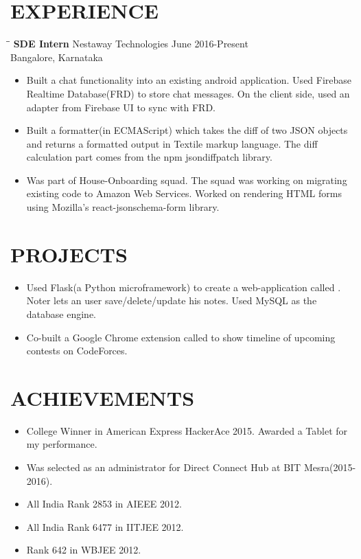 \documentclass{res}
\begin{document}
\begin{resume}
 
\section{EXPERIENCE}
   \vspace{-0.1in}	
   \begin{tabbing}
   \hspace{2.1in}\= \hspace{2.3in}\= \kill %
    {\bf SDE Intern} \>Nestaway  Technologies   \>June 2016-Present\\
                             \>Bangalore, Karnataka
   \end{tabbing}      %
   \begin{itemize}
    \item Built a chat functionality into an existing android application. Used Firebase Realtime Database(FRD) to store chat messages. On the client side, used an adapter from Firebase UI to sync with FRD.
    \item Built a formatter(in ECMAScript) which takes the diff of two JSON objects and returns a formatted output in Textile markup language. The diff calculation part comes from the npm jsondiffpatch library.
    \item Was part of House-Onboarding squad. The squad was working on migrating existing code to Amazon Web Services. Worked on rendering HTML forms using Mozilla's react-jsonschema-form library.
    \end{itemize}

\section{PROJECTS}          
    \begin{itemize}
    \item Used Flask(a Python microframework) to create a web-application called . Noter lets an user save/delete/update his notes. Used MySQL as the database engine. 
    \item Co-built a Google Chrome extension called  to show timeline of upcoming contests on CodeForces.  
    \end{itemize}
 
 
\section{ACHIEVEMENTS}          
   \begin{itemize}
   \item College Winner in American Express HackerAce 2015. Awarded a Tablet for my performance.
    \item Was selected as an administrator for Direct Connect Hub at BIT Mesra(2015-2016).
    \item All India Rank 2853 in AIEEE 2012.
    \item All India Rank 6477 in IITJEE 2012.
    \item Rank 642 in WBJEE 2012.
    \end{itemize}       
 

\end{resume}
\end{document}
